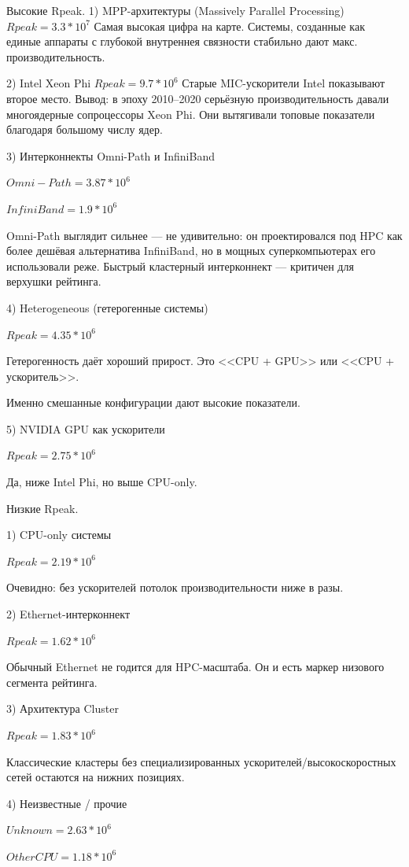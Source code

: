 \documentclass[14pt,a4paper]{extarticle}
\begin{document}
Высокие Rpeak.
1) MPP-архитектуры (Massively Parallel Processing)
$ Rpeak = 3.3*10^7 $
Самая высокая цифра на карте. Системы, созданные как единые аппараты с глубокой внутреннея связности
стабильно дают макс. производительность.

2) Intel Xeon Phi
$ Rpeak = 9.7*10^6 $
Старые MIC-ускорители Intel показывают второе место. Вывод: в эпоху 2010–2020
серьёзную производительность давали многоядерные сопроцессоры Xeon Phi. Они
вытягивали топовые показатели благодаря большому числу ядер.

3) Интерконнекты Omni-Path и InfiniBand

$ Omni-Path = 3.87*10^6 $

$
InfiniBand = 1.9*10^6
$

Omni-Path выглядит сильнее — не удивительно: он проектировался под HPC как
более дешёвая альтернатива InfiniBand, но в мощных суперкомпьютерах его
использовали реже. Быстрый кластерный интерконнект — критичен для верхушки рейтинга.

4) Heterogeneous (гетерогенные системы)

$
Rpeak = 4.35*10^6
$

Гетерогенность даёт хороший прирост. Это <<CPU + GPU>> или <<CPU + ускоритель>>.

Именно смешанные конфигурации дают высокие показатели.

5) NVIDIA GPU как ускорители

$
Rpeak = 2.75*10^6
$

Да, ниже Intel Phi, но выше CPU-only.

Низкие Rpeak.

1) CPU-only системы

$
Rpeak = 2.19*10^6
$

Очевидно: без ускорителей потолок производительности ниже в разы.

2) Ethernet-интерконнект

$
Rpeak = 1.62*10^6
$

Обычный Ethernet не годится для HPC-масштаба.
Он и есть маркер низового сегмента рейтинга.

3) Архитектура Cluster

$
Rpeak = 1.83*10^6
$

Классические кластеры без специализированных ускорителей/высокоскоростных сетей остаются на нижних позициях.

4) Неизвестные / прочие

$
Unknown = 2.63*10^6
$

$
Other CPU = 1.18*10^6
$
\end{document}
